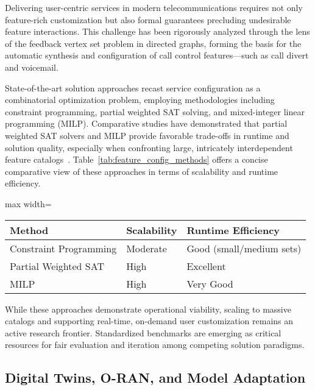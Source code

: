 Delivering user-centric services in modern telecommunications requires not only feature-rich customization but also formal guarantees precluding undesirable feature interactions. This challenge has been rigorously analyzed through the lens of the feedback vertex set problem in directed graphs, forming the basis for the automatic synthesis and configuration of call control features—such as call divert and voicemail.

State-of-the-art solution approaches recast service configuration as a combinatorial optimization problem, employing methodologies including constraint programming, partial weighted SAT solving, and mixed-integer linear programming (MILP). Comparative studies have demonstrated that partial weighted SAT solvers and MILP provide favorable trade-offs in runtime and solution quality, especially when confronting large, intricately interdependent feature catalogs~\cite{ref31}. Table~\ref{tab:feature_config_methods} offers a concise comparative view of these approaches in terms of scalability and runtime efficiency.

\begin{table*}[htbp]
\centering
\caption{Comparison of Feature Configuration Optimization Approaches}
\label{tab:feature_config_methods}
\begin{adjustbox}{max width=\textwidth}
\begin{tabular}{lll}
\toprule
\textbf{Method} & \textbf{Scalability} & \textbf{Runtime Efficiency} \\
\midrule
Constraint Programming     & Moderate         & Good (small/medium sets)   \\
Partial Weighted SAT       & High             & Excellent                  \\
MILP                      & High             & Very Good                  \\
\bottomrule
\end{tabular}
\end{adjustbox}
\end{table*}

While these approaches demonstrate operational viability, scaling to massive catalogs and supporting real-time, on-demand user customization remains an active research frontier. Standardized benchmarks are emerging as critical resources for fair evaluation and iteration among competing solution paradigms.

\subsection{Digital Twins, O-RAN, and Model Adaptation}

